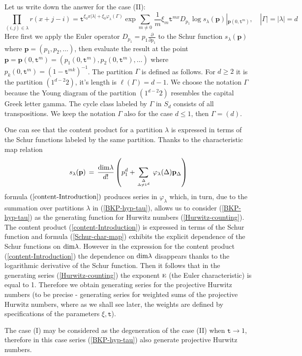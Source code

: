 \documentclass[a4paper,10pt]{article}
\newcommand{\bpow}{\mathbf{p}}
\theoremstyle{plain}
\theoremstyle{remark}
\def\be{\begin{equation}}
\def\ee{\end{equation}}
\begin{document}
 Let us write down the answer for the case (II):
\be\label{content-Introduction}
\prod_{(i,j)\in\lambda}r(x+j-i)= \texttt{t}^{\xi_0 x |\lambda|+\xi_0 \varphi_\lambda(\Gamma)}\exp
\sum_{m\neq 0}\, \frac1m \xi_m \texttt{t}^{mx} D_{p_1}\log s_\lambda(\bpow)|_{\bpow(0,\texttt{t}^m)},\quad |\Gamma|=|\lambda|=d
\ee
Here first we apply the Euler operator $D_{p_1}=p_1\frac{\partial}{\partial p_1}$  to the Schur function $s_\lambda(\bpow)$
where $\bpow=(p_1,p_2,\dots)$, then
evaluate the result at the point $\bpow=\bpow(0,\texttt{t}^m)=(p_1(0,\texttt{t}^m),p_2(0,\texttt{t}^m),\dots)$
where $p_k(0,\texttt{t}^m)=(1-\texttt{t}^{mk})^{-1}$.
The partition $\Gamma$ is defined as follows. For $d\ge 2 $ it is the partition $(1^{d-2}2)$,
 it's length is $\ell(\Gamma)=d-1$.  We choose the notation $\Gamma$ because the Young diagram of the
partition $(1^{d-2}2)$ resembles the capital Greek letter gamma. The cycle class labeled by $\Gamma$ in $S_d$
consists of all transpositions. We keep the notation $\Gamma$ also for the case $d\le 1$, then
$\Gamma=(d)$.


One can see that the content product for a partition $\lambda$ is expressed in terms of the Schur functions labeled
by the same partition. Thanks to the characteristic map relation \cite{Mac}
\be\label{Schur-char-map}
s_\lambda(\bpow)\,=\,\frac{{\rm dim}\lambda}{d!}
\left(p_1^d +\sum_{\Delta\atop \Delta\neq 1^d}\,\varphi_\lambda(\Delta) \bpow_\Delta  \right)
\ee
formula $(\ref{content-Introduction})$ produces series in $\varphi_\lambda$ which, in turn, due to the summation
over partitions $\lambda$ in (\ref{BKP-hyp-tau}), allows us to consider (\ref{BKP-hyp-tau}) as the generating function
for Hurwitz numbers (\ref{Hurwitz-counting}). The content product (\ref{content-Introduction}) is expressed
in terms of the Schur function and formula (\ref{Schur-char-map}) exhibits the explicit dependence of the Schur
functions on ${\rm dim \lambda}$. However in the expression for the content product (\ref{content-Introduction}) the
dependence on ${\rm dim \lambda}$ disappears thanks to the logarithmic derivative of the Schur function.
Then it follows that in the generating
series (\ref{Hurwitz-counting}) the exponent $\textsc{e}$ (the Euler characteristic) is equal to 1. Therefore we obtain
generating series for the projective Hurwitz numbers (to be precise - generating series for weighted sums of the projective Hurwitz
numbers, where as we shall see later, the weights are defined by specifications of the parameters $\xi,\texttt{t}$).

The case (I) may be considered as the degeneration of the case (II) when $\texttt{t}\to 1$, therefore
in this case series (\ref{BKP-hyp-tau}) also generate projective Hurwitz numbers.
\end{document}
